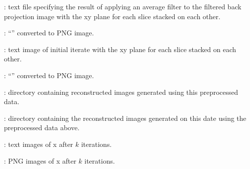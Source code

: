 \begin{tcbfunctionenv}
\begin{tcbparagraph}
\begin{deepList}[labelindent=1pt, leftmargin=*]
\begin{deepList}[labelindent=1pt, leftmargin=*]
\begin{deepList}[labelindent=1pt, leftmargin=*]
\begin{deepList}[labelindent=1pt, leftmargin=*]
\begin{deepList}[labelindent=1pt, leftmargin=*]
\begin{deepList}[labelindent=1pt, leftmargin=*]
\begin{deepList}[labelindent=1pt, leftmargin=*]
\begin{deepList}[labelindent=1pt, leftmargin=*]
\begin{deepList}[labelindent=1pt, leftmargin=*]
                                        \item {} : text file specifying the result of applying an average filter to the filtered back projection image with the xy plane for each slice stacked on each other.
                                        \item {} : ``'' converted to PNG image.
                                        \item {} : text image of initial iterate with the xy plane for each slice stacked on each other.
                                        \item {} : ``'' converted to PNG image.
                                        \item {} : directory containing reconstructed images generated using this preprocessed data.
                                        \begin{deepList}[labelindent=1pt, leftmargin=*]
                                            \item {} : directory containing the reconstructed images generated on this date using the preprocessed data above.
                                                \begin{deepList}[labelindent=1pt, leftmargin=*]
                                                    \item {} : text images of x after $k$ iterations.
                                                    \item {} : PNG images of x after $k$ iterations.
                                                \end{deepList}%

\end{deepList}
\end{deepList}
\end{deepList}
\end{deepList}
\end{deepList}
\end{deepList}
\end{deepList}
\end{deepList}
\end{deepList}
\end{deepList}
\end{tcbparagraph}
\end{tcbfunctionenv}
